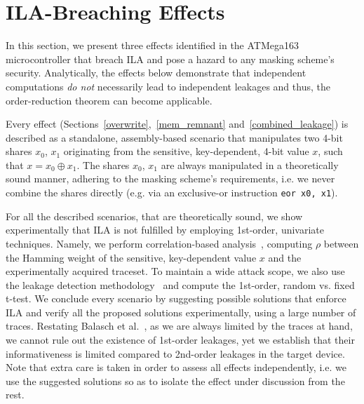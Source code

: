 \section{ILA-Breaching Effects}\label{sec:ila_effects}

In this section, we present three effects identified in the ATMega163 microcontroller that breach ILA and pose a hazard to any masking scheme's security. Analytically, the effects below demonstrate that independent computations \emph{do not} necessarily lead to independent leakages and thus, the order-reduction theorem can become applicable.

Every effect (Sections~\ref{overwrite},~\ref{mem_remnant} and~\ref{combined_leakage}) is described as a standalone, assembly-based scenario that manipulates two 4-bit shares $x_0$, $x_1$ originating from the sensitive, key-dependent, 4-bit value $x$, such that $x=x_0 \oplus x_1$. The shares $x_0$, $x_1$ are always manipulated in a theoretically sound manner, adhering to the masking scheme's requirements, i.e. we never combine the shares directly (e.g. via an exclusive-or instruction \texttt{eor x0, x1}). 

For all the described scenarios, that are theoretically sound, we show experimentally that ILA is not fulfilled by employing 1st-order, univariate techniques. Namely, we perform correlation-based analysis~\cite{DBLP:conf/ches/BrierCO04}, computing $\rho$ between the Hamming weight of the sensitive, key-dependent value $x$ and the experimentally acquired traceset. To maintain a wide attack scope, we also use the leakage detection methodology~\cite{tvla,DBLP:conf/ches/SchneiderM15} and compute the 1st-order, random vs. fixed t-test. 
 We conclude every scenario by suggesting possible solutions that enforce ILA and verify all the proposed solutions experimentally, using a large number of traces. Restating Balasch et al.~\cite{DBLP:conf/cardis/BalaschGGRS14}, as we are always limited by the traces at hand, we cannot rule out the existence of 1st-order leakages, yet we establish that their informativeness is limited compared to 2nd-order leakages in the target device. Note that extra care is taken in order to assess all effects independently, i.e. we use the suggested solutions so as to isolate the effect under discussion from the rest.

